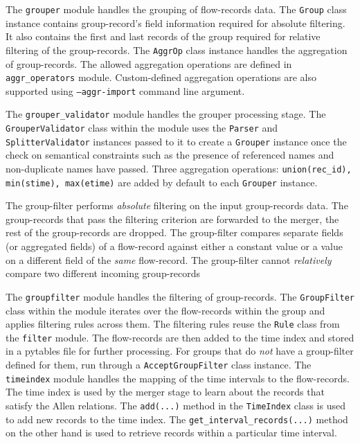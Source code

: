 The \texttt{grouper} module handles the grouping of flow-records data. The
\texttt{Group} class instance contains group-record's field information
required for absolute filtering. It also contains the first and last records
of the group required  for relative
filtering of the group-records. The \texttt{AggrOp} class instance handles the
aggregation of group-records. The allowed aggregation operations are defined
in \texttt{aggr\_operators} module.  Custom-defined aggregation operations are
also supported using \texttt{--aggr-import} command line argument.

The \texttt{grouper\_validator} module handles the grouper processing stage.
The \texttt{GrouperValidator} class within the module uses the \texttt{Parser}
and \texttt{SplitterValidator} instances passed to it to create a
\texttt{Grouper} instance once  the check on
semantical constraints such as the presence of referenced names and
non-duplicate names have passed. Three aggregation operations:
\texttt{union(rec\_id), min(stime), max(etime)} are added by default to each
\texttt{Grouper} instance.

The group-filter performs \emph{absolute} filtering on the input group-records
data. The group-records that pass the filtering criterion are forwarded to the
merger, the rest of the group-records are dropped. The group-filter compares
 separate fields (or aggregated fields) of a
flow-record against either a constant value or a value on a different field of
the \emph{same} flow-record. The group-filter cannot \emph{relatively} compare
two different incoming group-records

The \texttt{groupfilter} module handles the filtering of group-records. The
\texttt{GroupFilter} class within the module iterates over the flow-records
within the group and applies filtering rules across them. The filtering rules
reuse the \texttt{Rule} class from the \texttt{filter} module. The
flow-records are then added to the time index and stored in a pytables file
for further processing. For groups that do \emph{not} have a group-filter
defined for them, run  through a
\texttt{AcceptGroupFilter} class instance.  The \texttt{timeindex} module
handles the mapping of the time intervals to the flow-records. The time index
is used by the merger stage to learn about the records that satisfy the Allen
relations. The \texttt{add(...)} method in the \texttt{TimeIndex} class is
used to add new records to the time index. The
\texttt{get\_interval\_records(...)} method on the other hand is used to
retrieve records within a particular time interval.

